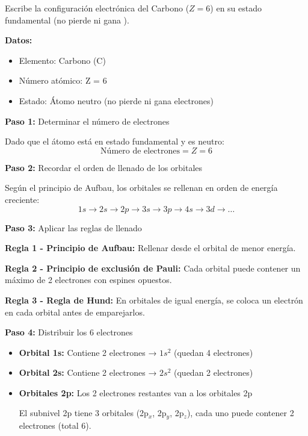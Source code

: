 \begin{exercise}
    Escribe la configuración electrónica del Carbono (\( Z = 6 \)) en su estado fundamental (no pierde ni gana \el{}).

    \begin{solu}
        \textbf{Datos:}
        \begin{itemize}
            \item Elemento: Carbono (C)
            \item Número atómico: Z = 6
            \item Estado: Átomo neutro (no pierde ni gana electrones)
        \end{itemize}

        \textbf{Paso 1:} Determinar el número de electrones

        Dado que el átomo está en estado fundamental y es neutro:
        \[
            \text{Número de electrones} = Z = 6
        \]

        \textbf{Paso 2:} Recordar el orden de llenado de los orbitales

        Según el principio de Aufbau, los orbitales se rellenan en orden de energía creciente:
        \[
            1s \rightarrow 2s \rightarrow 2p \rightarrow 3s \rightarrow 3p \rightarrow 4s \rightarrow 3d \rightarrow \ldots
        \]

        \textbf{Paso 3:} Aplicar las reglas de llenado

        \textbf{Regla 1 - Principio de Aufbau:} Rellenar desde el orbital de menor energía.

        \textbf{Regla 2 - Principio de exclusión de Pauli:} Cada orbital puede contener un máximo de 2 electrones con espines opuestos.

        \textbf{Regla 3 - Regla de Hund:} En orbitales de igual energía, se coloca un electrón en cada orbital antes de emparejarlos.

        \textbf{Paso 4:} Distribuir los 6 electrones

        \begin{itemize}
            \item \textbf{Orbital 1s:} Contiene 2 electrones → \(1s^2\) (quedan 4 electrones)
            \item \textbf{Orbital 2s:} Contiene 2 electrones → \(2s^2\) (quedan 2 electrones)
            \item \textbf{Orbitales 2p:} Los 2 electrones restantes van a los orbitales 2p

            El subnivel 2p tiene 3 orbitales (2p\(_x\), 2p\(_y\), 2p\(_z\)), cada uno puede contener 2 electrones (total 6).


\end{itemize}
\end{solu}
\end{exercise}
